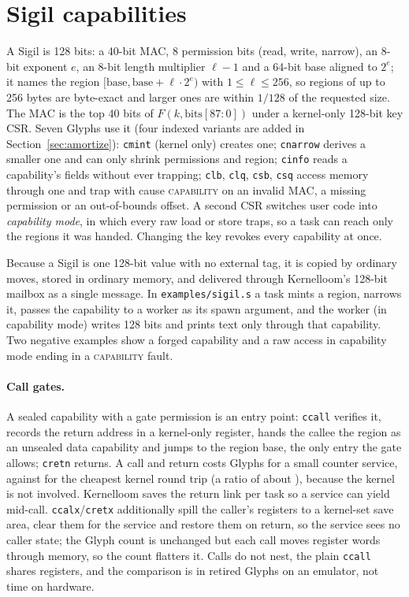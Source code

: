 \documentclass[10pt,a4paper]{article}
\begin{document}
\section{Sigil capabilities}
A Sigil is 128 bits: a 40-bit MAC, 8 permission bits (read, write, narrow), an 8-bit exponent $e$, an 8-bit length multiplier $\ell{-}1$ and a 64-bit base aligned to $2^e$; it names the region $[\mathrm{base},\mathrm{base}+\ell\cdot 2^e)$ with $1\le\ell\le256$, so regions of up to 256 bytes are byte-exact and larger ones are within $1/128$ of the requested size. The MAC is the top 40 bits of $F(k, \text{bits}[87{:}0])$ under a kernel-only 128-bit key CSR. Seven Glyphs use it (four indexed variants are added in Section~\ref{sec:amortize}): \texttt{cmint} (kernel only) creates one; \texttt{cnarrow} derives a smaller one and can only shrink permissions and region; \texttt{cinfo} reads a capability's fields without ever trapping; \texttt{clb}, \texttt{clq}, \texttt{csb}, \texttt{csq} access memory through one and trap with cause \textsc{capability} on an invalid MAC, a missing permission or an out-of-bounds offset. A second CSR switches user code into \emph{capability mode}, in which every raw load or store traps, so a task can reach only the regions it was handed. Changing the key revokes every capability at once.

Because a Sigil is one 128-bit value with no external tag, it is copied by ordinary moves, stored in ordinary memory, and delivered through Kernelloom's 128-bit mailbox as a single message. In \texttt{examples/sigil.s} a task mints a region, narrows it, passes the capability to a worker as its spawn argument, and the worker (in capability mode) writes 128 bits and prints text only through that capability. Two negative examples show a forged capability and a raw access in capability mode ending in a \textsc{capability} fault.

\paragraph{Call gates.} A sealed capability with a gate permission is an entry point: \texttt{ccall} verifies it, records the return address in a kernel-only register, hands the callee the region as an unsealed data capability and jumps to the region base, the only entry the gate allows; \texttt{cretn} returns. A call and return costs \GateCall{} Glyphs for a small counter service, against \SyscallCost{} for the cheapest kernel round trip (a ratio of about \GateRatio{}), because the kernel is not involved. Kernelloom saves the return link per task so a service can yield mid-call. \texttt{ccalx}/\texttt{cretx} additionally spill the caller's registers to a kernel-set save area, clear them for the service and restore them on return, so the service sees no caller state; the Glyph count is unchanged but each call moves \IsoWords{} register words through memory, so the count flatters it. Calls do not nest, the plain \texttt{ccall} shares registers, and the comparison is in retired Glyphs on an emulator, not time on hardware.
\end{document}
